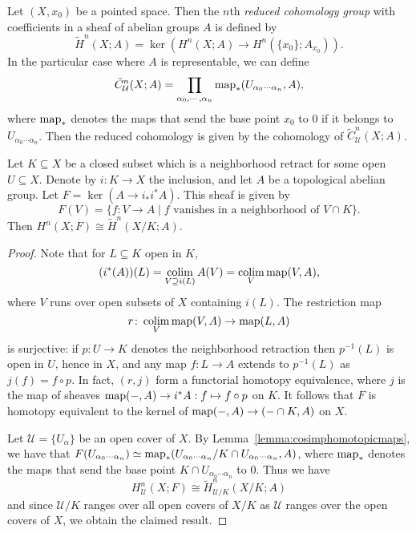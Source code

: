 \documentclass[a4paper,openany]{scrbook}
\begin{document}
\begin{defn}
Let $(X,x_0)$ be a pointed space. Then the $n$th \emph{reduced cohomology group} with coefficients in a sheaf of abelian groups $A$ is defined by
\[
\tilde H^n(X;A) = \ker(H^n(X;A) \to H^n(\{x_0\};A_{x_0})).
\]
In the particular case where $A$ is representable, we can define
\[
\tilde C^n_{\mathcal U}(X;A) = \prod_{\alpha_0,\cdots,\alpha_n} \operatorname{map}_*(U_{\alpha_0\cdots\alpha_n},A),
\]
where $\operatorname{map}_*$ denotes the maps that send the base point $x_0$ to $0$ if it belongs to $U_{\alpha_0\cdots\alpha_n}$. Then the reduced cohomology is given by the cohomology of $\tilde C^n_{\mathcal U}(X;A)$.
\end{defn}

\begin{lemma}\label{lemma:cohomologyofquotient}
Let $K \subseteq X$ be a closed subset which is a neighborhood retract for some open $U \subseteq X$. Denote by $i\colon K \to X$ the inclusion, and let $A$ be a topological abelian group. Let $F = \ker(A \to i_*i^*A)$. This sheaf is given by
\[
F(V) = \{f\colon V \to A \mid f \text{ vanishes in a neighborhood of $V \cap K$}\}.
\]
Then $H^n(X;F) \cong \tilde H^n(X/K;A)$.
\end{lemma}
\begin{proof}
Note that for $L \subseteq K$ open in $K$, 
\[
(i^*(A))(L) = \operatorname*{colim}_{V \supseteq i(L)} A(V) = \operatorname*{colim}_V \operatorname{map}(V,A),
\]
where $V$ runs over open subsets of $X$ containing $i(L)$. The restriction map
\[
r\colon \operatorname*{colim}_V \operatorname{map}(V,A) \to \operatorname{map}(L,A)
\]
is surjective: if $p\colon U \to K$ denotes the neighborhood retraction then $p^{-1}(L)$ is open in $U$, hence in $X$, and any map $f\colon L \to A$ extends to $p^{-1}(L)$ as $j(f) = f\circ p$. In fact, $(r,j)$ form a functorial homotopy equivalence, where $j$ is the map of sheaves $\operatorname{map}(-,A) \to i^*A: f \mapsto f \circ p$ on $K$. It follows that $F$ is homotopy equivalent to the kernel of $\operatorname{map}(-,A) \to (- \cap K, A)$ on $X$.

Let $\mathcal U = \{U_\alpha\}$ be an open cover of $X$. By Lemma~\ref{lemma:cosimphomotopicmaps}, we have that $F(U_{\alpha_0\cdots\alpha_n}) \simeq \operatorname{map}_*(U_{\alpha_0\cdots\alpha_n}/K \cap U_{\alpha_0\cdots\alpha_n},A)$, where $\operatorname{map}_*$ denotes the maps that send the base point $K \cap U_{\alpha_0\cdots\alpha_n}$ to $0$. Thus we have
\[
H^n_{\mathcal U}(X;F) \cong \tilde H^n_{\mathcal U/K}(X/K;A)
\]
and since $\mathcal U/K$ ranges over all open covers of $X/K$ as $\mathcal U$ ranges over the open covers of $X$, we obtain the claimed result.
\end{proof} 
\end{document}

